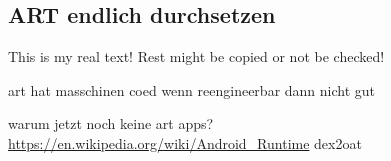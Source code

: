 \subsection{ART endlich durchsetzen} \label{subsection:external-art}
This is my real text! Rest might be copied or not be checked!


art hat masschinen coed\newline
wenn reengineerbar dann nicht gut

warum jetzt noch keine art apps?
\url{https://en.wikipedia.org/wiki/Android_Runtime}\newline
dex2oat\newline
